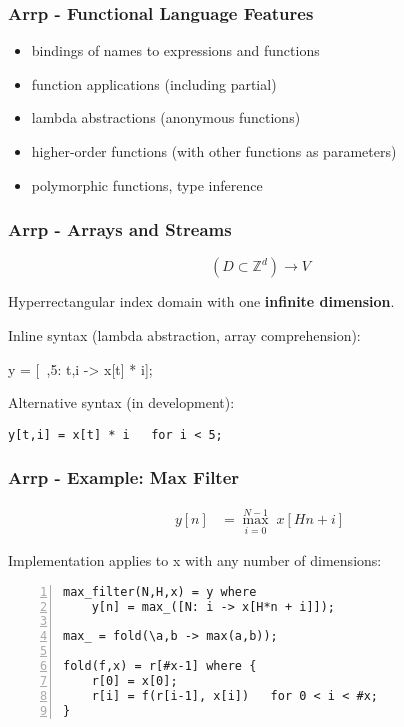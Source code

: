 \documentclass{beamer}
\begin{document}
\begin{frame}
\frametitle{Arrp - Functional Language Features}

\begin{itemize}
\item bindings of names to expressions and functions
\item function applications (including partial)
\item lambda abstractions (anonymous functions)
\item higher-order functions (with other functions as parameters)
\item polymorphic functions, type inference
\end{itemize}

\end{frame}

\begin{frame}[fragile]
\frametitle{Arrp - Arrays and Streams}

\[(D \subset \mathbb{Z}^d) \to V\]

Hyperrectangular index domain with one \textbf{infinite dimension}.
\vspace{\baselineskip}

Inline syntax (lambda abstraction, array comprehension):

\begin{semiverbatim}
y = [~,5: t,i -> x[t] * i];
\end{semiverbatim}

Alternative syntax (in development):

\begin{verbatim}
y[t,i] = x[t] * i   for i < 5;
\end{verbatim}

\end{frame}

\begin{frame}[fragile]
\frametitle{Arrp - Example: Max Filter}

\begin{align*}
y[n] &= \max_{i = 0}^{N-1} \; x[Hn+i]
\end{align*}

Implementation applies to x with any number of dimensions:

\vspace{1em}
\begin{Verbatim}[numbers=left]
max_filter(N,H,x) = y where
    y[n] = max_([N: i -> x[H*n + i]]);

max_ = fold(\a,b -> max(a,b));

fold(f,x) = r[#x-1] where {
    r[0] = x[0];
    r[i] = f(r[i-1], x[i])   for 0 < i < #x;
}
\end{Verbatim}

\end{frame}
\end{document}
